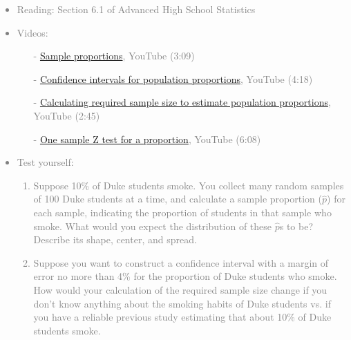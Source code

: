 \documentclass[11pt]{article}
\newcommand{\gray}[1]{\textcolor{gray}{#1}}
\begin{document}
\gray{
{\it
\vspace{-0.55cm}
\begin{itemize}
\renewcommand{\labelitemi}{{\textcolor{dark}{$\ast$}}}
\item Reading: Section 6.1 of Advanced High School Statistics
\item Videos: 
\begin{itemize}
\item[-] \href{http://www.youtube.com/watch?v=MWff4_ORZjM}{Sample proportions}, YouTube (3:09)
\item[-] \href{http://www.youtube.com/watch?v=3ReWri_jh3M}{Confidence intervals for population proportions}, YouTube (4:18)
\item[-] \href{http://www.youtube.com/watch?v=OyuQn-P8iQ0}{Calculating required sample size to estimate population proportions}, YouTube (2:45)
\item[-] \href{http://www.youtube.com/watch?v=dH6igFVoCAw}{One sample Z test for a proportion}, YouTube (6:08)
\end{itemize}
\item Test yourself:
\begin{enumerate}
\item Suppose 10\% of Duke students smoke. You collect many random samples of 100 Duke students at a time, and calculate a sample proportion ($\hat{p}$) for each sample, indicating the proportion of students in that sample who smoke. What would you expect the distribution of these $\hat{p}$s to be? Describe its shape, center, and spread.
\item Suppose you want to construct a confidence interval with a margin of error no more than 4\% for the proportion of Duke students who smoke. How would your calculation of the required sample size change if you don't know anything about the smoking habits of Duke students vs. if you have a reliable previous study estimating that about 10\% of Duke students smoke.
\end{enumerate}
\end{itemize}
}}

%

\vspace{0.48cm}
\end{document}
